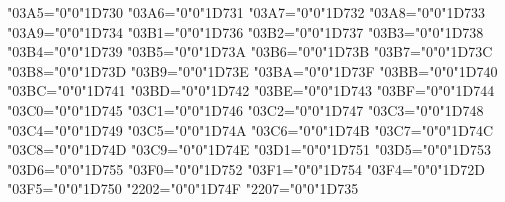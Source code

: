{    \Umathcode"03A5="0"0"1D730%
    \Umathcode"03A6="0"0"1D731%
    \Umathcode"03A7="0"0"1D732%
    \Umathcode"03A8="0"0"1D733%
    \Umathcode"03A9="0"0"1D734%
    \Umathcode"03B1="0"0"1D736%
    \Umathcode"03B2="0"0"1D737%
    \Umathcode"03B3="0"0"1D738%
    \Umathcode"03B4="0"0"1D739%
    \Umathcode"03B5="0"0"1D73A%
    \Umathcode"03B6="0"0"1D73B%
    \Umathcode"03B7="0"0"1D73C%
    \Umathcode"03B8="0"0"1D73D%
    \Umathcode"03B9="0"0"1D73E%
    \Umathcode"03BA="0"0"1D73F%
    \Umathcode"03BB="0"0"1D740%
    \Umathcode"03BC="0"0"1D741%
    \Umathcode"03BD="0"0"1D742%
    \Umathcode"03BE="0"0"1D743%
    \Umathcode"03BF="0"0"1D744%
    \Umathcode"03C0="0"0"1D745%
    \Umathcode"03C1="0"0"1D746%
    \Umathcode"03C2="0"0"1D747%
    \Umathcode"03C3="0"0"1D748%
    \Umathcode"03C4="0"0"1D749%
    \Umathcode"03C5="0"0"1D74A%
    \Umathcode"03C6="0"0"1D74B%
    \Umathcode"03C7="0"0"1D74C%
    \Umathcode"03C8="0"0"1D74D%
    \Umathcode"03C9="0"0"1D74E%
    \Umathcode"03D1="0"0"1D751%
    \Umathcode"03D5="0"0"1D753%
    \Umathcode"03D6="0"0"1D755%
    \Umathcode"03F0="0"0"1D752%
    \Umathcode"03F1="0"0"1D754%
    \Umathcode"03F4="0"0"1D72D%
    \Umathcode"03F5="0"0"1D750%
    \Umathcode"2202="0"0"1D74F%
    \Umathcode"2207="0"0"1D735%
    \relax
}

\everymathtt {%
}

